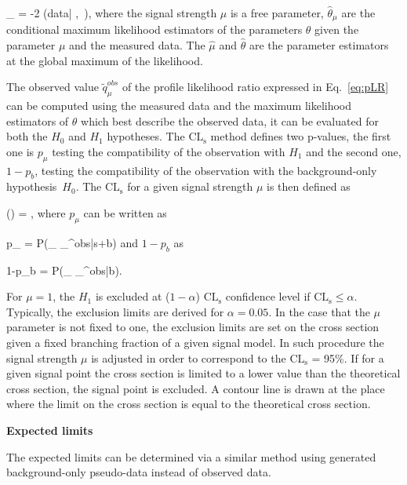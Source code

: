 {
_{\mu} = -2   {(data| \hat{\mu} ,~\hat{\theta})},
}
where the signal strength $\mu$ is a free parameter, $\hat{\theta}_{\mu}$ are the conditional maximum likelihood estimators of the parameters $\theta$ given the parameter $\mu$ and the measured data. The $\hat{\mu}$ and $\hat{\theta}$ are the parameter estimators at the global maximum of the likelihood. 
	  
The observed value $\tilde{q}_{\mu}^{obs}$ of the profile likelihood ratio expressed in Eq.~\ref{eq:pLR} can be computed using the measured data and the maximum likelihood estimators of $\theta$ which best describe the observed data, it can be evaluated for both the $H_{0}$ and $H_{1}$ hypotheses. The $\mathrm{CL_{s}}$  method defines two p-values, the first one is $p_{\mu}$ testing the compatibility of the observation with $H_{1}$ and the second one, $1-p_{b}$, testing the compatibility of the observation with the background-only hypothesis~$H_{0}$. The $\mathrm{CL_{s}}$ for a given signal strength $\mu$ is then defined as

{
(\mu) = ,
}
where $p_{\mu}$ can be written as

{
p_{\mu} = P(_{\mu} \geq {}_{\mu}^{obs}|s+b)
}
and $1-p_{b}$ as

{
1-p_{b} = P(_{\mu} \geq {}_{\mu}^{obs}|b).
}

For $\mu=1$, the $H_{1}$ is excluded at ($1-\alpha$) $\mathrm{CL_{s}}$ confidence level if $\mathrm{CL_{s}} \leq \alpha$. Typically, the exclusion limits are derived for $\alpha = 0.05$. In the case that the $\mu$ parameter is not fixed to one, the exclusion limits are set on the cross section given a fixed branching fraction of a given signal model. In such procedure the signal strength $\mu$ is adjusted in order to correspond to the $\mathrm{CL_{s}}$ = 95\%. If for a given signal point the cross section is limited to a lower value than the theoretical cross section, the signal point is excluded. A contour line is drawn at the place where the limit on the cross section is equal to the theoretical cross section.

\textbf{Expected limits}

The expected limits can be determined via a similar method using generated background-only pseudo-data instead of observed data. 

